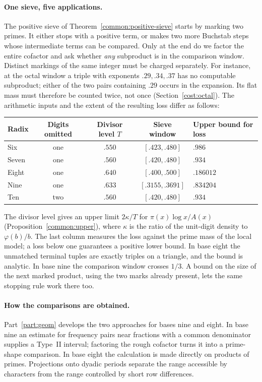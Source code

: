 \documentclass[11pt,a4paper]{article}
\theoremstyle{paperplain}
\numberwithin{equation}{section}
\begin{document}
\paragraph{One sieve, five applications.}
The positive sieve of Theorem~\ref{common:positive-sieve} starts by
marking two primes. It either stops with a positive term, or makes
two more Buchstab steps whose intermediate terms can be compared.
Only at the end do we factor the entire cofactor and ask whether
\emph{any} subproduct is in the comparison window. Distinct markings
of the same integer must be charged separately. For instance, at
the octal window a triple with exponents $.29,.34,.37$ has no
computable subproduct; either of the two pairs containing $.29$
occurs in the expansion. Its flat mass must therefore be counted
twice, not once (Section~\ref{cost:octal}). The arithmetic inputs
and the extent of the resulting loss differ as follows:
\begin{center}
\begin{tabular}{@{}lcccl@{}}\toprule
Radix & Digits omitted & Divisor level $T$ & Sieve window & Upper bound for loss\\\midrule
Six   & one & $.550$ & $[.423,.480]$ & $.986$\\
Seven & one & $.560$ & $[.420,.480]$ & $.934$\\
Eight & one & $.640$ & $[.400,.500]$ & $.186012$\\
Nine  & one & $.633$ & $[.3155,.3691]$ & $.834204$\\
Ten   & two & $.560$ & $[.420,.480]$ & $.934$\\\bottomrule
\end{tabular}
\end{center}
The divisor level gives an upper limit $2\kappa/T$ for $\pi(x)\log x/A(x)$
(Proposition~\ref{common:upper}), where $\kappa$ is the ratio of the
unit-digit density to $\varphi(b)/b$. The last column measures the loss against the prime mass of the
local model; a loss below one guarantees a positive lower bound. In base eight
the unmatched terminal tuples are exactly triples on a triangle, and
the bound is analytic. In base nine the comparison window crosses
$1/3$. A bound on the size of the next marked product, using the two
marks already present, lets the same stopping rule work there too.

\paragraph{How the comparisons are obtained.}
Part~\ref{part:geom} develops the two approaches for bases nine and
eight. In base nine an estimate for frequency pairs near fractions
with a common denominator supplies a Type~II interval; factoring the
rough cofactor turns it into a prime-shape comparison. In base eight
the calculation is made directly on products of primes. Projections
onto dyadic periods separate the range accessible by characters from
the range controlled by short row differences.
\end{document}
